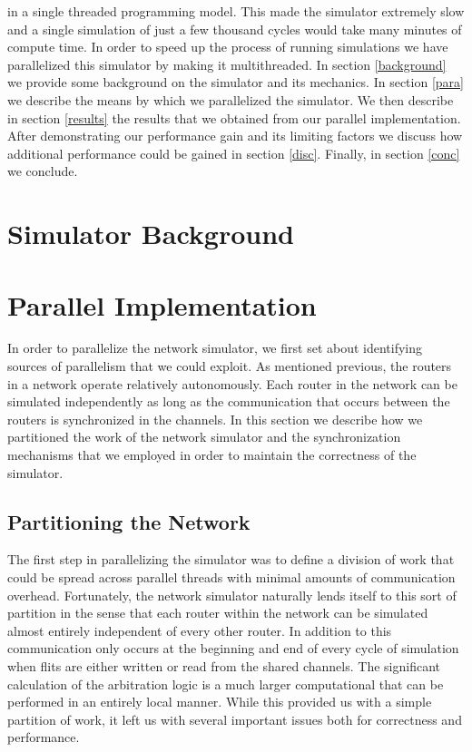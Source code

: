 \documentclass[twocolumn]{article}
\begin{document}
in a single threaded programming model.  This made the simulator extremely
slow and a single simulation of just a few thousand cycles would take many
minutes of compute time.  In order to speed up the process of running
simulations we have parallelized this simulator by making it
multithreaded.  In section \ref{background} we provide some background on
the simulator and its mechanics.  In section \ref{para} we describe the
means by which we parallelized the simulator.  We then describe in section
\ref{results} the results that we obtained from our parallel
implementation.  After demonstrating our performance gain and its limiting
factors we discuss how additional performance could be gained in section
\ref{disc}.  Finally, in section \ref{conc} we conclude.

\section{Simulator Background \label{background}}


\section{Parallel Implementation \label{para}}
In order to parallelize the network simulator, we first set about
identifying sources of parallelism that we could exploit.  As mentioned previous, the routers in a network operate relatively autonomously.   Each router in the network can be simulated
independently as long as the communication that occurs between the routers
is synchronized in the channels.  In this section we describe how we
partitioned the work of the network simulator and the synchronization
mechanisms that we employed in order to maintain the correctness of the simulator.

\subsection{Partitioning the Network}
The first step in parallelizing the simulator was to define a division of
work that could be spread across parallel threads with minimal amounts of
communication overhead.  Fortunately, the network simulator naturally
lends itself to this sort of partition in the sense that each router
within the network can be simulated almost entirely independent of every
other router.  In addition to this communication only occurs at the
beginning and end of every cycle of simulation when flits are either
written or read from the shared channels.  The significant
calculation of the arbitration logic is a much larger computational that
can be performed in an entirely local manner.  While this provided us with
a simple partition of work, it left us with several important issues both
for correctness and performance.
\end{document}
